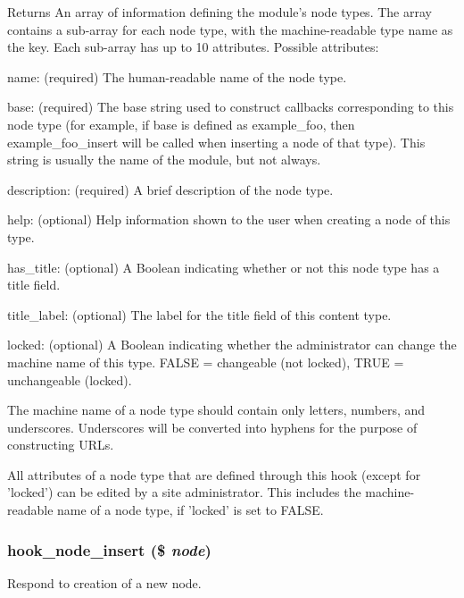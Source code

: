 \begin{DoxyReturn}{Returns}
An array of information defining the module's node types. The array contains a sub-\/array for each node type, with the machine-\/readable type name as the key. Each sub-\/array has up to 10 attributes. Possible attributes:
\begin{DoxyItemize}
\item name: (required) The human-\/readable name of the node type.
\item base: (required) The base string used to construct callbacks corresponding to this node type (for example, if base is defined as example\_\-foo, then example\_\-foo\_\-insert will be called when inserting a node of that type). This string is usually the name of the module, but not always.
\item description: (required) A brief description of the node type.
\item help: (optional) Help information shown to the user when creating a node of this type.
\item has\_\-title: (optional) A Boolean indicating whether or not this node type has a title field.
\item title\_\-label: (optional) The label for the title field of this content type.
\item locked: (optional) A Boolean indicating whether the administrator can change the machine name of this type. FALSE = changeable (not locked), TRUE = unchangeable (locked).
\end{DoxyItemize}
\end{DoxyReturn}
The machine name of a node type should contain only letters, numbers, and underscores. Underscores will be converted into hyphens for the purpose of constructing URLs.

All attributes of a node type that are defined through this hook (except for 'locked') can be edited by a site administrator. This includes the machine-\/readable name of a node type, if 'locked' is set to FALSE. \hypertarget{group__node__api__hooks_ga8b40dc62e46e5055c205d2a723dc3548}{
\subsubsection[{hook\_\-node\_\-insert}]{\setlength{\rightskip}{0pt plus 5cm}hook\_\-node\_\-insert (\$ {\em node})}}
\label{group__node__api__hooks_ga8b40dc62e46e5055c205d2a723dc3548}
Respond to creation of a new node.

